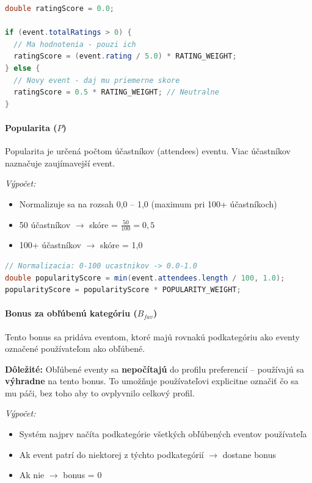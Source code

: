 \begin{lstlisting}[language=Java, caption=Výpočet skóre ratingu]
double ratingScore = 0.0;

if (event.totalRatings > 0) {
  // Ma hodnotenia - pouzi ich
  ratingScore = (event.rating / 5.0) * RATING_WEIGHT;
} else {
  // Novy event - daj mu priemerne skore
  ratingScore = 0.5 * RATING_WEIGHT; // Neutralne
}
\end{lstlisting}

\paragraph{Popularita ($P$)}

Popularita je určená počtom účastníkov (attendees) eventu. Viac účastníkov naznačuje zaujímavejší event.

\textit{Výpočet:}
\begin{itemize}
    \item Normalizuje sa na rozsah 0,0 -- 1,0 (maximum pri 100+ účastníkoch)
    \item 50 účastníkov $\rightarrow$ skóre = $\frac{50}{100} = 0{,}5$
    \item 100+ účastníkov $\rightarrow$ skóre = 1,0
\end{itemize}

\begin{lstlisting}[language=Java, caption=Výpočet skóre popularity]
// Normalizacia: 0-100 ucastnikov -> 0.0-1.0
double popularityScore = min(event.attendees.length / 100, 1.0);
popularityScore = popularityScore * POPULARITY_WEIGHT;
\end{lstlisting}

\paragraph{Bonus za obľúbenú kategóriu ($B_{fav}$)}

Tento bonus sa pridáva eventom, ktoré majú rovnakú podkategóriu ako eventy označené používateľom ako obľúbené.

\textbf{Dôležité:} Obľúbené eventy sa \textbf{nepočítajú} do profilu preferencií -- používajú sa \textbf{výhradne} na tento bonus. To umožňuje používateľovi explicitne označiť čo sa mu páči, bez toho aby to ovplyvnilo celkový profil.

\textit{Výpočet:}
\begin{itemize}
    \item Systém najprv načíta podkategórie všetkých obľúbených eventov používateľa
    \item Ak event patrí do niektorej z týchto podkategórií $\rightarrow$ dostane bonus
    \item Ak nie $\rightarrow$ bonus = 0
\end{itemize}

